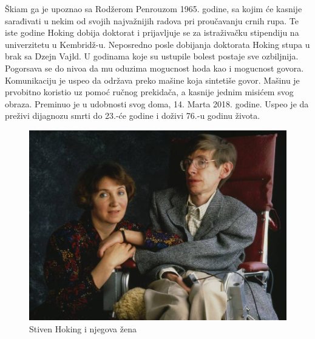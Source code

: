 \documentclass[a4paper, 12pt]{article}
\begin{document}
{Škiam ga je upoznao sa Rodžerom Penrouzom 1965. godine, sa kojim će kasnije sarađivati 
u nekim od svojih najvažnijih radova pri proučavanju crnih rupa. Te iste godine Hoking 
dobija doktorat i prijavljuje se za istraživačku stipendiju na univerzitetu u 
Kembridž-u. Neposredno posle dobijanja doktorata Hoking stupa u brak sa Dzejn Vajld. 
U godinama koje su ustupile bolest postaje sve ozbiljnija. Pogorsava se do nivoa da mu oduzima mogucnost hoda kao i mogucnost govora.
Komunikaciju je uspeo da održava preko mašine koja sintetiše govor. Mašinu je prvobitno koristio uz pomoć ručnog prekidača, 
a kasnije jednim misićem svog obraza. Preminuo je u udobnosti svog doma, 14. Marta 
2018. godine. Uspeo je da preživi dijagnozu smrti do 23.-će godine  i doživi 76.-u 
godinu života. \cite{hawkingcom} \cite{famousscientists} 

\newpage
\begin{figure}[h!]
\begin{center}
\includegraphics[width=1.0\textwidth]{StivenHoking.jpeg}
\end{center}
\caption{Stiven Hoking i njegova žena}
\label{fig:Stiven Hoking}
\end{figure}

}
\end{document}
